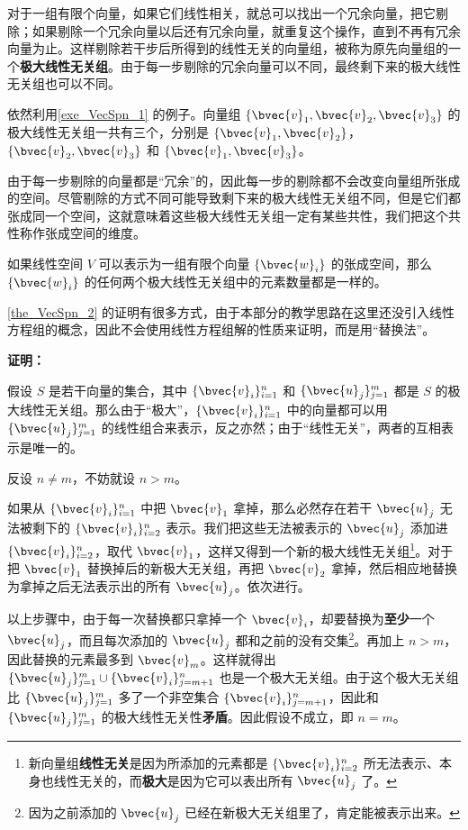 对于一组有限个向量，如果它们线性相关，就总可以找出一个冗余向量，把它剔除；如果剔除一个冗余向量以后还有冗余向量，就重复这个操作，直到不再有冗余向量为止。这样剔除若干步后所得到的线性无关的向量组，被称为原先向量组的一个\textbf{极大线性无关组}。由于每一步剔除的冗余向量可以不同，最终剩下来的极大线性无关组也可以不同。

\begin{example}{}
依然利用\autoref{exe_VecSpn_1} 的例子。向量组 $\{\bvec{v}_1, \bvec{v}_2, \bvec{v}_3\}$ 的极大线性无关组一共有三个，分别是 $\{\bvec{v}_1, \bvec{v}_2\}$，$\{\bvec{v}_2, \bvec{v}_3\}$ 和 $\{\bvec{v}_1, \bvec{v}_3\}$。
\end{example}

由于每一步剔除的向量都是“冗余”的，因此每一步的剔除都不会改变向量组所张成的空间。尽管剔除的方式不同可能导致剩下来的极大线性无关组不同，但是它们都张成同一个空间，这就意味着这些极大线性无关组一定有某些共性，我们把这个共性称作张成空间的维度。

\begin{theorem}{}\label{the_VecSpn_2}
如果线性空间 $V$ 可以表示为一组有限个向量 $\{\bvec{w}_i\}$ 的张成空间，那么 $\{\bvec{w}_i\}$ 的任何两个极大线性无关组中的元素数量都是一样的。
\end{theorem}

\autoref{the_VecSpn_2} 的证明有很多方式，由于本部分的教学思路在这里还没引入线性方程组的概念，因此不会使用线性方程组解的性质来证明，而是用“替换法”。

\textbf{证明：}

假设 $S$ 是若干向量的集合，其中 $\{\bvec{v}_i\}_{i=1}^n$ 和 $\{\bvec{u}_j\}^m_{j=1}$ 都是 $S$ 的极大线性无关组。那么由于“极大”，$\{\bvec{v}_i\}_{i=1}^n$ 中的向量都可以用 $\{\bvec{u}_j\}^m_{j=1}$ 的线性组合来表示，反之亦然；由于“线性无关”，两者的互相表示是唯一的。

反设 $n\not=m$，不妨就设 $n>m$。

如果从 $\{\bvec{v}_i\}_{i=1}^n$ 中把 $\bvec{v}_1$ 拿掉，那么必然存在若干 $\bvec{u}_j$ 无法被剩下的 $\{\bvec{v}_i\}_{i=2}^n$ 表示。我们把这些无法被表示的 $\bvec{u}_j$ 添加进 $\{\bvec{v}_i\}_{i=2}^n$，取代 $\bvec{v}_1$，这样又得到一个新的极大线性无关组\footnote{新向量组\textbf{线性无关}是因为所添加的元素都是 $\{\bvec{v}_i\}_{i=2}^n$ 所无法表示、本身也线性无关的，而\textbf{极大}是因为它可以表出所有 $\bvec{u}_j$ 了。}。对于把 $\bvec{v}_1$ 替换掉后的新极大无关组，再把 $\bvec{v}_2$ 拿掉，然后相应地替换为拿掉之后无法表示出的所有 $\bvec{u}_j$。依次进行。

以上步骤中，由于每一次替换都只拿掉一个 $\bvec{v}_i$，却要替换为\textbf{至少}一个 $\bvec{u}_j$，而且每次添加的 $\bvec{u}_j$ 都和之前的没有交集\footnote{因为之前添加的 $\bvec{u}_j$ 已经在新极大无关组里了，肯定能被表示出来。}。再加上 $n>m$，因此替换的元素最多到 $\bvec{v}_m$。这样就得出 $\{\bvec{u}_j\}^m_{j=1}\cup\{\bvec{v}_i\}^n_{j=m+1}$ 也是一个极大无关组。由于这个极大无关组比 $\{\bvec{u}_j\}^m_{j=1}$ 多了一个非空集合 $\{\bvec{v}_i\}^n_{j=m+1}$，因此和 $\{\bvec{u}_j\}^m_{j=1}$ 的极大线性无关性\textbf{矛盾}。因此假设不成立，即 $n=m$。

